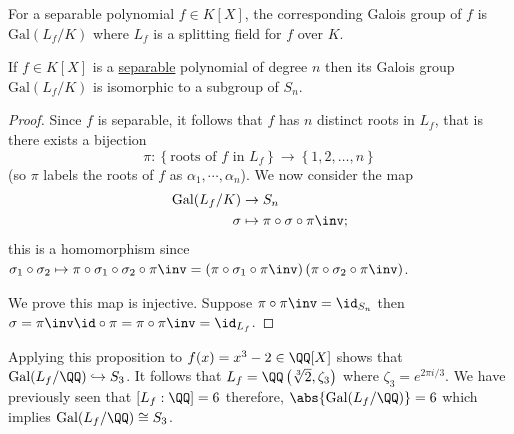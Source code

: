 \documentclass[12pt, a4paper]{article}
\newcommand{\gal}{\text{Gal}}
\begin{document}
\begin{definition}
    For a separable polynomial \(f\in K[X]\), the corresponding Galois group of \(f\) is \(\gal(L_f/K)\) where \(L_f\) is a splitting field for \(f\) over \(K\).
\end{definition}

\begin{mdprop}
    If \(f \in K[X]\) is a \ul{separable} polynomial of degree \(n\) then its Galois group \(\gal(L_f/K)\) is isomorphic to a subgroup of \(S_n\).
\end{mdprop}

\begin{proof}
    Since \(f\) is separable, it follows that \(f\) has \(n\) distinct roots in \(L_f\), that is there exists a bijection 
    \[\pi:\left\{ \text{roots of \(f\) in \(L_f\)}\right\} \to \left\{ 1,2,\ldots,n \right\} \]
    (so \(\pi\) labels the roots of \(f\) as \(\alpha_1,\cdots,\alpha_n\)). We now consider the map 
    \[\begin{aligned}
        \gal(L_f/K) &\to S_n \\
        \sigma &\mapsto \pi\circ \sigma \circ \pi\inv;
    \end{aligned}\]
    this is a homomorphism since \(\sigma_1 \circ \sigma_2 \mapsto \pi \circ \sigma_1\circ \sigma_2 \circ\pi\inv = \left( \pi\circ \sigma_1 \circ \pi\inv \right)\left( \pi\circ \sigma_2 \circ \pi\inv \right)\). 

    We prove this map is injective. Suppose \(\pi\circ\pi\inv=\id_{S_n}\) then \(\sigma = \pi\inv\id\circ\pi=\pi\circ\pi\inv=\id_{L_f}\).
\end{proof}

\begin{example}
    Applying this proposition to \(f(x)=x^3-2 \in \QQ[X]\) shows that \\\({\gal(L_f/\QQ) \hookrightarrow S_3}\). It follows that \(L_f = \QQ\left( \sqrt[3]{2},\zeta_3 \right)\) where \(\zeta_3 = e^{2\pi i/3}\). We have previously seen that \(\left[ L_f: \QQ \right] =6\) therefore, \(\abs{\gal(L_f/\QQ)}=6\) which implies \(\gal(L_f/\QQ)\cong S_3\).
\end{example}
\end{document}

